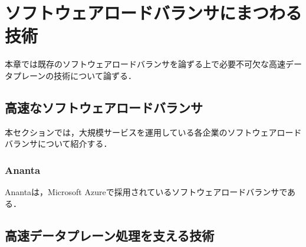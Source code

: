 \chapter{ソフトウェアロードバランサにまつわる技術}
\label{related}
本章では既存のソフトウェアロードバランサを論ずる上で必要不可欠な高速データプレーンの技術について論ずる．






\section{高速なソフトウェアロードバランサ}
\label{related:rapidlb}
本セクションでは，大規模サービスを運用している各企業のソフトウェアロードバランサについて紹介する．
\subsection{Ananta}
Anantaは，Microsoft Azureで採用されているソフトウェアロードバランサである．


\section{高速データプレーン処理を支える技術}
\label{related:a-dplane}


